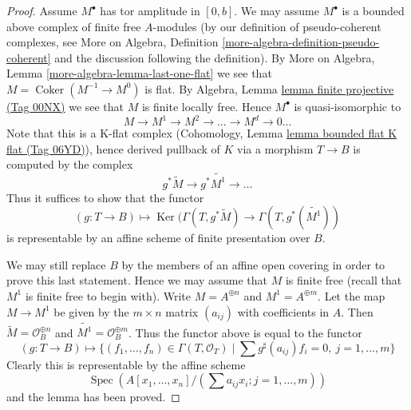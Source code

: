 \documentclass{amsart}
\theoremstyle{plain}
\theoremstyle{definition}
\theoremstyle{remark}
\numberwithin{equation}{subsection}
\def\Spec{\mathop{\mathrm{Spec}}}
\def\Ker{\mathop{\mathrm{Ker}}}
\def\Coker{\mathop{\mathrm{Coker}}}
\begin{document}
\begin{proof}
\medskip\noindent
Assume $M^\bullet$ has tor amplitude in $[0, b]$.
We may assume $M^\bullet$ is a bounded above complex of finite free
$A$-modules (by our definition of pseudo-coherent complexes, see
More on Algebra, Definition \ref{more-algebra-definition-pseudo-coherent}
and the discussion following the definition).
By More on Algebra, Lemma \ref{more-algebra-lemma-last-one-flat}
we see that $M = \Coker(M^{- 1} \to M^0)$ is flat. By
Algebra, Lemma \href{https://stacks.math.columbia.edu/tag/00NX}{lemma finite projective (Tag 00NX)} we see that $M$
is finite locally free. Hence $M^\bullet$ is quasi-isomorphic to
$$
M \to M^1 \to M^2 \to \ldots \to M^d \to 0 \ldots
$$
Note that this is a K-flat complex
(Cohomology, Lemma \href{https://stacks.math.columbia.edu/tag/06YD}{lemma bounded flat K flat (Tag 06YD)}),
hence derived pullback of $K$ via a morphism $T \to B$ is computed
by the complex
$$
g^*\widetilde{M} \to g^*\widetilde{M^1} \to \ldots
$$
Thus it suffices to show that the functor
$$
(g : T \to B) \longmapsto
\Ker(
\Gamma(T,g^*\widetilde{M})
\to
\Gamma(T, g^*(\widetilde{M^1})
)
$$
is representable by an affine scheme of finite presentation over $B$.

\medskip\noindent
We may still replace $B$ by the members of an affine open covering
in order to prove this last statement. Hence we may assume that $M$
is finite free (recall that $M^1$ is finite free to begin with).
Write $M = A^{\oplus n}$ and $M^1 = A^{\oplus m}$. Let the map
$M \to M^1$ be given by the $m \times n$ matrix $(a_{ij})$ with
coefficients in $A$. Then $\widetilde{M} = \mathcal{O}_B^{\oplus n}$
and $\widetilde{M^1} = \mathcal{O}_B^{\oplus m}$. Thus the functor
above is equal to the functor
$$
(g : T \to B) \longmapsto
\{(f_1, \ldots, f_n) \in \Gamma(T, \mathcal{O}_T) \mid
\sum g^\sharp(a_{ij})f_i = 0,\ j = 1, \ldots, m\}
$$
Clearly this is representable by the affine scheme
$$
\Spec\left(A[x_1, \ldots, x_n]/(\sum a_{ij}x_i; j = 1, \ldots, m)\right)
$$
and the lemma has been proved.
\end{proof}
\end{document}
